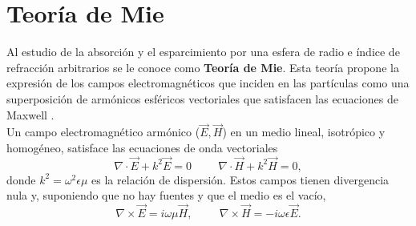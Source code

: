\section{Teoría de Mie}
Al estudio de la absorción y el esparcimiento por una esfera de radio e índice de refracción arbitrarios se le conoce como \textbf{Teoría de Mie}. Esta teoría propone la expresión de los campos electromagnéticos que inciden en las partículas como una superposición de armónicos esféricos vectoriales que satisfacen las ecuaciones de Maxwell . \cite{Bohren}\\

Un campo electromagnético armónico ($\Vec{E},\Vec{H}$) en un medio lineal, isotrópico y homogéneo, satisface las ecuaciones de onda vectoriales \cite{Bohren}
\begin{equation}
	\nabla\cdot\Vec{E}+k^2\Vec{E}=0 \hspace{1cm}\nabla\cdot\Vec{H}+k^2\Vec{H}=0,
\end{equation}
donde $k^2=\omega^2\epsilon\mu$ es la relación de dispersión. Estos campos tienen divergencia nula y, suponiendo que no hay fuentes y que el medio es el vacío,
\begin{equation}
	\nabla\times\Vec{E}=i\omega\mu\Vec{H},\hspace{1cm}\nabla\times\Vec{H}=-i\omega\epsilon\Vec{E}.
\end{equation}

